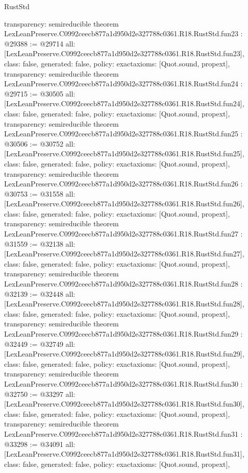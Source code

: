 \begin{lexlean}{RustStd}
\begin{coremodule}
{  transparency: semireducible
}
theorem LexLeanPreserve.C0992ceecb877a1d950d2e327788c0361.R18.RustStd.fun23 : @29388 := @29714 {
  all: [LexLeanPreserve.C0992ceecb877a1d950d2e327788c0361.R18.RustStd.fun23],
  class: false,
  generated: false,
  policy: exact{axioms: [Quot.sound, propext]},
  transparency: semireducible
}
theorem LexLeanPreserve.C0992ceecb877a1d950d2e327788c0361.R18.RustStd.fun24 : @29715 := @30505 {
  all: [LexLeanPreserve.C0992ceecb877a1d950d2e327788c0361.R18.RustStd.fun24],
  class: false,
  generated: false,
  policy: exact{axioms: [Quot.sound, propext]},
  transparency: semireducible
}
theorem LexLeanPreserve.C0992ceecb877a1d950d2e327788c0361.R18.RustStd.fun25 : @30506 := @30752 {
  all: [LexLeanPreserve.C0992ceecb877a1d950d2e327788c0361.R18.RustStd.fun25],
  class: false,
  generated: false,
  policy: exact{axioms: [Quot.sound, propext]},
  transparency: semireducible
}
theorem LexLeanPreserve.C0992ceecb877a1d950d2e327788c0361.R18.RustStd.fun26 : @30753 := @31558 {
  all: [LexLeanPreserve.C0992ceecb877a1d950d2e327788c0361.R18.RustStd.fun26],
  class: false,
  generated: false,
  policy: exact{axioms: [Quot.sound, propext]},
  transparency: semireducible
}
theorem LexLeanPreserve.C0992ceecb877a1d950d2e327788c0361.R18.RustStd.fun27 : @31559 := @32138 {
  all: [LexLeanPreserve.C0992ceecb877a1d950d2e327788c0361.R18.RustStd.fun27],
  class: false,
  generated: false,
  policy: exact{axioms: [Quot.sound, propext]},
  transparency: semireducible
}
theorem LexLeanPreserve.C0992ceecb877a1d950d2e327788c0361.R18.RustStd.fun28 : @32139 := @32448 {
  all: [LexLeanPreserve.C0992ceecb877a1d950d2e327788c0361.R18.RustStd.fun28],
  class: false,
  generated: false,
  policy: exact{axioms: [Quot.sound, propext]},
  transparency: semireducible
}
theorem LexLeanPreserve.C0992ceecb877a1d950d2e327788c0361.R18.RustStd.fun29 : @32449 := @32749 {
  all: [LexLeanPreserve.C0992ceecb877a1d950d2e327788c0361.R18.RustStd.fun29],
  class: false,
  generated: false,
  policy: exact{axioms: [Quot.sound, propext]},
  transparency: semireducible
}
theorem LexLeanPreserve.C0992ceecb877a1d950d2e327788c0361.R18.RustStd.fun30 : @32750 := @33297 {
  all: [LexLeanPreserve.C0992ceecb877a1d950d2e327788c0361.R18.RustStd.fun30],
  class: false,
  generated: false,
  policy: exact{axioms: [Quot.sound, propext]},
  transparency: semireducible
}
theorem LexLeanPreserve.C0992ceecb877a1d950d2e327788c0361.R18.RustStd.fun31 : @33298 := @34091 {
  all: [LexLeanPreserve.C0992ceecb877a1d950d2e327788c0361.R18.RustStd.fun31],
  class: false,
  generated: false,
  policy: exact{axioms: [Quot.sound, propext]},
}
\end{coremodule}
\end{lexlean}
